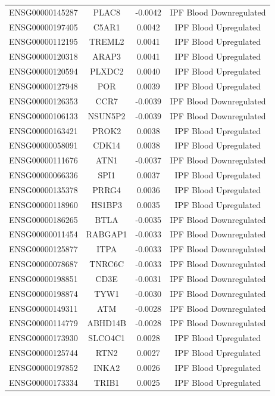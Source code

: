\documentclass[
]{article}
\begin{document}
\begin{singlespace}
\begin{longtable}[t]{lccc}
ENSG00000145287 & PLAC8 & -0.0042 & IPF Blood Downregulated\\
ENSG00000197405 & C5AR1 & 0.0042 & IPF Blood Upregulated\\
ENSG00000112195 & TREML2 & 0.0041 & IPF Blood Upregulated\\
ENSG00000120318 & ARAP3 & 0.0041 & IPF Blood Upregulated\\
\addlinespace
ENSG00000120594 & PLXDC2 & 0.0040 & IPF Blood Upregulated\\
ENSG00000127948 & POR & 0.0039 & IPF Blood Upregulated\\
ENSG00000126353 & CCR7 & -0.0039 & IPF Blood Downregulated\\
ENSG00000106133 & NSUN5P2 & -0.0039 & IPF Blood Downregulated\\
ENSG00000163421 & PROK2 & 0.0038 & IPF Blood Upregulated\\
\addlinespace
ENSG00000058091 & CDK14 & 0.0038 & IPF Blood Upregulated\\
ENSG00000111676 & ATN1 & -0.0037 & IPF Blood Downregulated\\
ENSG00000066336 & SPI1 & 0.0037 & IPF Blood Upregulated\\
ENSG00000135378 & PRRG4 & 0.0036 & IPF Blood Upregulated\\
ENSG00000118960 & HS1BP3 & 0.0035 & IPF Blood Upregulated\\
\addlinespace
ENSG00000186265 & BTLA & -0.0035 & IPF Blood Downregulated\\
ENSG00000011454 & RABGAP1 & -0.0033 & IPF Blood Downregulated\\
ENSG00000125877 & ITPA & -0.0033 & IPF Blood Downregulated\\
ENSG00000078687 & TNRC6C & -0.0033 & IPF Blood Downregulated\\
ENSG00000198851 & CD3E & -0.0031 & IPF Blood Downregulated\\
\addlinespace
ENSG00000198874 & TYW1 & -0.0030 & IPF Blood Downregulated\\
ENSG00000149311 & ATM & -0.0028 & IPF Blood Downregulated\\
ENSG00000114779 & ABHD14B & -0.0028 & IPF Blood Downregulated\\
ENSG00000173930 & SLCO4C1 & 0.0028 & IPF Blood Upregulated\\
ENSG00000125744 & RTN2 & 0.0027 & IPF Blood Upregulated\\
\addlinespace
ENSG00000197852 & INKA2 & 0.0026 & IPF Blood Upregulated\\
ENSG00000173334 & TRIB1 & 0.0025 & IPF Blood Upregulated\\

\end{longtable}
\end{singlespace}
\end{document}
